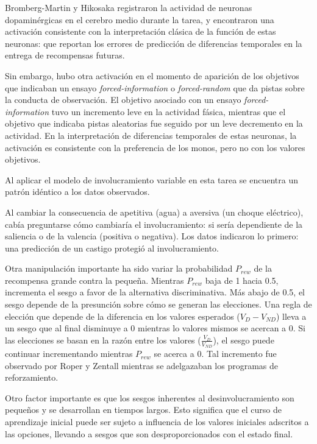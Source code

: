 \documentclass[a4paper,12pt]{article}
\begin{document}
Bromberg-Martin y Hikosaka registraron la actividad de neuronas dopaminérgicas en el cerebro medio durante la tarea, y encontraron una activación consistente con la interpretación clásica de la función de estas neuronas: que reportan los errores de predicción de diferencias temporales en la entrega de recompensas futuras.

Sin embargo, hubo otra activación en el momento de aparición de los objetivos que indicaban un ensayo {\itshape forced-information} o {\itshape forced-random} que da pistas sobre la conducta de observación. El objetivo asociado con un ensayo {\itshape forced-information} tuvo un incremento leve en la actividad fásica, mientras que el objetivo que indicaba pistas aleatorias fue seguido por un leve decremento en la actividad. En la interpretación de  diferencias temporales de estas neuronas, la activación es consistente con la preferencia de los monos, pero no con los valores objetivos.

Al aplicar el modelo de involucramiento variable en esta tarea se encuentra un patrón idéntico a los datos observados. 

Al cambiar la consecuencia de apetitiva (agua) a aversiva (un choque eléctrico), cabía preguntarse cómo cambiaría el involucramiento: si sería dependiente de la saliencia o de la valencia (positiva o negativa). Los datos indicaron lo primero: una predicción de un castigo protegió al involucramiento. 

Otra manipulación importante ha sido variar la probabilidad $P_{rew}$ de la recompensa grande contra la pequeña. Mientras $P_{rew}$ baja de 1 hacia 0.5, incrementa el sesgo a favor de la alternativa discriminativa. Más abajo de 0.5, el sesgo depende de la presunción sobre cómo se generan las elecciones. Una regla de elección que depende de la diferencia en los valores esperados ($V_{D} - V_{ND}$) lleva a un sesgo que al final disminuye a 0 mientras lo valores mismos se acercan a 0. Si las elecciones se basan en la razón entre los valores ($\frac{V_{D}}{V_{ND}}$), el sesgo puede continuar incrementando mientras $P_{rew}$ se acerca a 0. Tal incremento fue observado por Roper y Zentall mientras se adelgazaban los programas de reforzamiento.

Otro factor importante es que los sesgos inherentes al desinvolucramiento son pequeños y se desarrollan en tiempos largos. Esto significa que el curso de aprendizaje inicial puede ser sujeto a influencia de los valores iniciales adscritos a las opciones, llevando a sesgos que son desproporcionados con el estado final.
\end{document}
